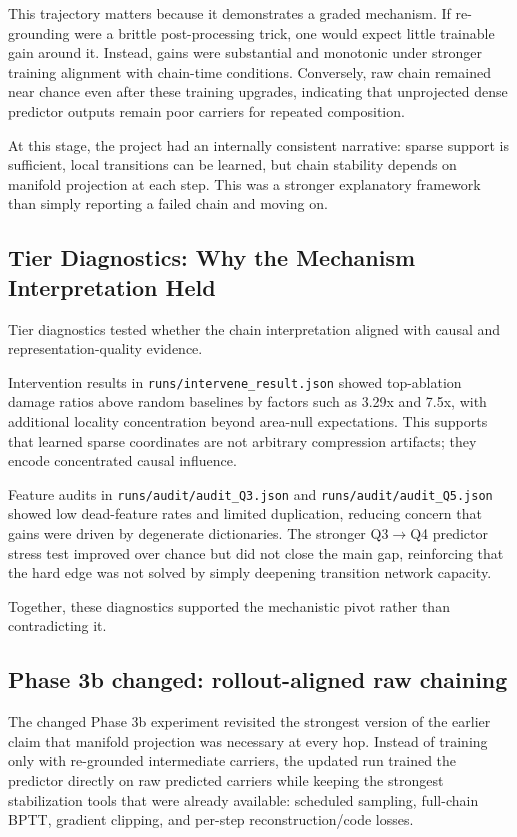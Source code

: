 \documentclass[11pt]{article}
\begin{document}
This trajectory matters because it demonstrates a graded mechanism. If re-grounding were a brittle post-processing trick, one would expect little trainable gain around it. Instead, gains were substantial and monotonic under stronger training alignment with chain-time conditions. Conversely, raw chain remained near chance even after these training upgrades, indicating that unprojected dense predictor outputs remain poor carriers for repeated composition.

At this stage, the project had an internally consistent narrative: sparse support is sufficient, local transitions can be learned, but chain stability depends on manifold projection at each step. This was a stronger explanatory framework than simply reporting a failed chain and moving on.

\subsection{Tier Diagnostics: Why the Mechanism Interpretation Held}
Tier diagnostics tested whether the chain interpretation aligned with causal and representation-quality evidence.

Intervention results in \texttt{runs/intervene\_result.json} showed top-ablation damage ratios above random baselines by factors such as 3.29x and 7.5x, with additional locality concentration beyond area-null expectations. This supports that learned sparse coordinates are not arbitrary compression artifacts; they encode concentrated causal influence.

Feature audits in \texttt{runs/audit/audit\_Q3.json} and \texttt{runs/audit/audit\_Q5.json} showed low dead-feature rates and limited duplication, reducing concern that gains were driven by degenerate dictionaries. The stronger Q3$\rightarrow$Q4 predictor stress test improved over chance but did not close the main gap, reinforcing that the hard edge was not solved by simply deepening transition network capacity.

Together, these diagnostics supported the mechanistic pivot rather than contradicting it.

\subsection{Phase 3b changed: rollout-aligned raw chaining}
The changed Phase 3b experiment revisited the strongest version of the earlier claim that manifold projection was necessary at every hop. Instead of training only with re-grounded intermediate carriers, the updated run trained the predictor directly on raw predicted carriers while keeping the strongest stabilization tools that were already available: scheduled sampling, full-chain BPTT, gradient clipping, and per-step reconstruction/code losses.
\end{document}
